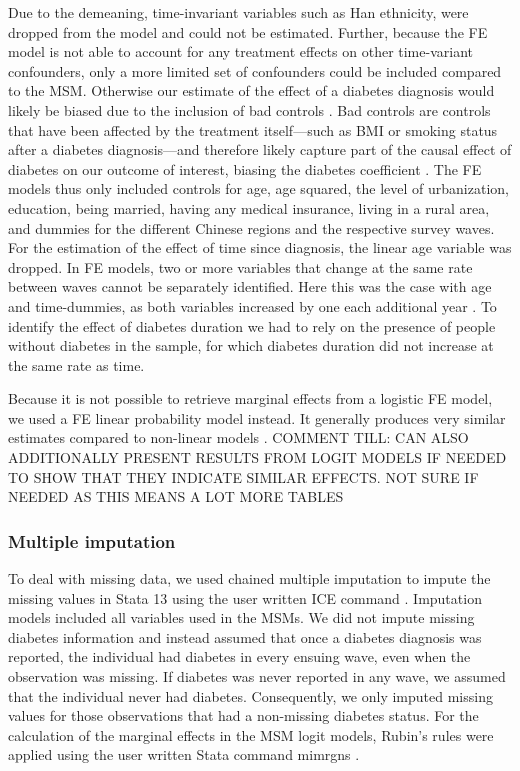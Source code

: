  Due to the demeaning, time-invariant variables such as Han ethnicity, were dropped from the model and could not be estimated. Further, because the \ac{FE} model is not able to account for any treatment effects on other time-variant confounders, only a more limited set of confounders could be included compared to the \ac{MSM}. Otherwise our estimate of the effect of a diabetes diagnosis would likely be biased due to the inclusion of bad controls \parencite{Angrist2009a}. Bad controls are controls that have been affected by the treatment itself---such as \ac{BMI} or smoking status after a diabetes diagnosis---and therefore likely capture part of the causal effect of diabetes on our outcome of interest, biasing the diabetes coefficient \parencite{Angrist2009a}. The \ac{FE} models thus only included controls for age, age squared, the level of urbanization, education, being married, having any medical insurance, living in a rural area, and dummies for the different Chinese regions and the respective survey waves. For the estimation of the effect of time since diagnosis, the linear age variable was dropped. In \ac{FE} models, two or more variables that change at the same rate between waves cannot be separately identified. Here this was the case with age and time-dummies, as both variables increased by one each additional year \parencite{Wooldridge2012}. To identify the effect of diabetes duration we had to rely on the presence of people without diabetes in the sample, for which diabetes duration did not increase at the same rate as time.

Because it is not possible to retrieve marginal effects from a logistic \ac{FE} model, we used a \ac{FE} linear probability model instead. It generally produces very similar estimates compared to non-linear models \parencite{Angrist2009a}. COMMENT TILL: CAN ALSO ADDITIONALLY PRESENT RESULTS FROM LOGIT MODELS IF NEEDED TO SHOW THAT THEY INDICATE SIMILAR EFFECTS. NOT SURE IF NEEDED AS THIS MEANS A LOT MORE TABLES

\subsubsection*{Multiple imputation}

To deal with missing data, we used chained multiple imputation to impute the missing values in Stata 13 using the user written ICE command \parencite{Royston2009}. Imputation models included all variables used in the \acp{MSM}. We did not impute missing diabetes information and instead assumed that once a diabetes diagnosis was reported, the individual had diabetes in every ensuing wave, even when the observation was missing. If diabetes was never reported in any wave, we assumed that the individual never had diabetes. Consequently, we only imputed missing values for those observations that had a non-missing diabetes status. For the calculation of the marginal effects in the \ac{MSM} logit models, Rubin's rules were applied using the user written Stata command mimrgns \parencite{Klein2014}.


